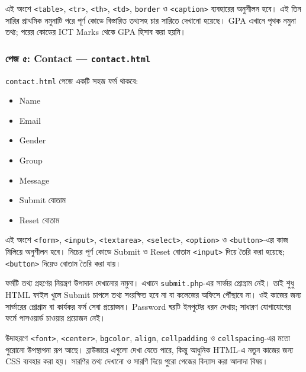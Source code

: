 এই অংশে \texttt{<table>}, \texttt{<tr>}, \texttt{<th>}, \texttt{<td>}, \texttt{border} ও \texttt{<caption>} ব্যবহারের অনুশীলন হবে। এই তিন সারির প্রাথমিক নমুনাটি পরে পূর্ণ কোডে বিস্তারিত তথ্যসহ চার সারিতে দেখানো হয়েছে। GPA এখানে পৃথক নমুনা তথ্য; পরের কোডের ICT Marks থেকে GPA হিসাব করা হয়নি।

\subsubsection{পেজ ৫: Contact — \texttt{contact.html}}

\texttt{contact.html} পেজে একটি সহজ ফর্ম থাকবে:
\par\noindent
\begin{minipage}[t]{.48\linewidth}\vspace{0pt}
\begin{itemize}
\item Name
\item Email
\item Gender
\item Group
\end{itemize}
\end{minipage}\hfill
\begin{minipage}[t]{.48\linewidth}\vspace{0pt}
\begin{itemize}
\item Message
\item Submit বোতাম
\item Reset বোতাম
\end{itemize}
\end{minipage}\par


এই অংশে \texttt{<form>}, \texttt{<input>}, \texttt{<textarea>}, \texttt{<select>}, \texttt{<option>} ও \texttt{<button>}-এর কাজ মিলিয়ে অনুশীলন হবে। নিচের পূর্ণ কোডে Submit ও Reset বোতাম \texttt{<input>} দিয়ে তৈরি করা হয়েছে; \texttt{<button>} দিয়েও বোতাম তৈরি করা যায়।

ফর্মটি তথ্য গ্রহণের নিয়ন্ত্রণ উপাদান দেখানোর নমুনা। এখানে \texttt{submit.php}-এর সার্ভার প্রোগ্রাম নেই। তাই শুধু HTML ফাইল খুলে Submit চাপলে তথ্য সংরক্ষিত হবে না বা কলেজের অফিসে পৌঁছাবে না। ওই কাজের জন্য সার্ভারের প্রোগ্রাম বা কার্যকর ফর্ম সেবা প্রয়োজন। Password ঘরটি ইনপুটের ধরন দেখায়; সাধারণ যোগাযোগের ফর্মে পাসওয়ার্ড চাওয়ার প্রয়োজন নেই।

উদাহরণে \texttt{<font>}, \texttt{<center>}, \texttt{bgcolor}, \texttt{align}, \texttt{cellpadding} ও \texttt{cellspacing}-এর মতো পুরোনো উপস্থাপনা রূপ আছে। ব্রাউজারে এগুলো দেখা যেতে পারে, কিন্তু আধুনিক HTML-এ নতুন কাজের জন্য CSS ব্যবহার করা হয়। সারণির তথ্য দেখানো ও সারণি দিয়ে পুরো পেজের বিন্যাস করা আলাদা বিষয়।

